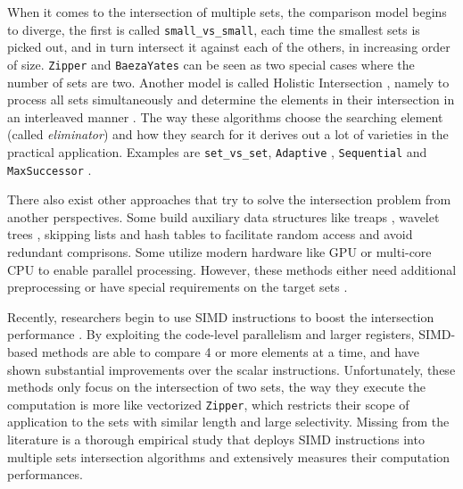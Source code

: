 \documentclass[runningheads,a4paper]{llncs}
\begin{document}
When it comes to the intersection of multiple sets, the comparison model begins to diverge, the first is called \texttt{small\_vs\_small}, each time the smallest sets is picked out, and in turn intersect it against each of the others, in increasing order of size.
\texttt{Zipper} and \texttt{BaezaYates} can be seen as two special cases where the number of sets are two.
Another model is called Holistic Intersection \cite{culpepper2010efficient}, namely to process all sets simultaneously and determine the elements in their intersection in an interleaved manner \cite{Culpepper2007Compact}.
The way these algorithms choose the searching element (called \textit{eliminator}) and how they search for it derives out a lot of varieties in the practical application.
Examples are \texttt{set\_vs\_set}, \texttt{Adaptive} \cite{Barbay2006Faster,Demaine2000Adaptive,Demaine2001Experiments}, \texttt{Sequential} \cite{Barbay2002Adaptive,Barbay2003Optimality} and \texttt{MaxSuccessor} \cite{Culpepper2007Compact}.

There also exist other approaches that try to solve the intersection problem from another perspectives.
Some build auxiliary data structures like treaps \cite{Blelloch1998Fast,chen2016efficient}, wavelet trees \cite{navarro2010dual}, skipping lists \cite{Culpepper2007Compact,Moffat1996Self} and hash tables \cite{Arroyuelo2010Compressed,Sanders2007Intersection} to facilitate random access and avoid redundant comprisons.
Some utilize modern hardware like GPU \cite{Ao2011Efficient,Wu2009A,Wu2010Efficient} or multi-core CPU \cite{Tatikonda2009On,tsirogiannis2009improving} to enable parallel processing.
However, these methods either need additional preprocessing or have special requirements on the target sets \cite{Inoue2014Faster}.

Recently, researchers begin to use SIMD instructions to boost the intersection performance \cite{Inoue2014Faster,Schlegel2010Fast,lemire2016simd}.
By exploiting the code-level parallelism and larger registers, SIMD-based methods are able to compare 4 or more elements at a time, and have shown substantial improvements over the scalar instructions.
Unfortunately, these methods only focus on the intersection of two sets, the way they execute the computation is more like vectorized \texttt{Zipper}, which restricts their scope of application to the sets with similar length and large selectivity.
Missing from the literature is a thorough empirical study that deploys SIMD instructions into multiple sets intersection algorithms and extensively measures their computation performances.
\end{document}
